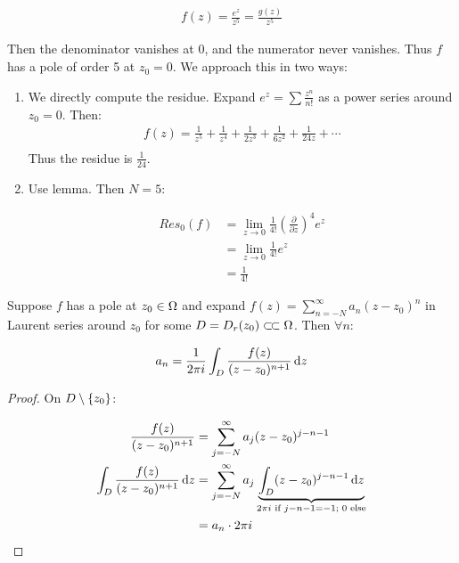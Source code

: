 \begin{example}
\begin{align*}
    f(z) = \frac{e^z}{z^5} = \frac{g(z)}{z^5}
\end{align*}

Then the denominator vanishes at 0, and the numerator never vanishes. Thus $f$ has a pole of order 5 at $z_0 = 0$. We approach this in two ways:

\begin{enumerate}
    \item We directly compute the residue. Expand $e^z = \sum \frac{z^n}{n!}$ as a power series around $z_0 = 0$. Then:
    \begin{align*}
        f(z) = \frac{1}{z^5} + \frac{1}{z^4} +\frac{1}{2z^3} + \frac{1}{6z^2} + \frac{1}{24z} + \cdots\\
    \end{align*}
    Thus the residue is $\frac{1}{24}$.
    
    \item Use lemma. Then $N=5$:
    
    \begin{align*}
        Res_{0}(f) &= \lim_{z \to 0} \frac{1}{4!} \left( \frac{\partial }{\partial z} \right)^4 e^z \\
        &= \lim_{z \to 0} \frac{1}{4!} e^z\\
        &= \frac{1}{4!}
    \end{align*}
\end{enumerate}
\end{example}

\begin{lemma}
Suppose $f$ has a pole at $z_0 \in \Omega$ and expand $f(z) = \sum_{n=-N}^\infty a_n (z-z_0)^n$ in Laurent series around $z_0$ for some $D = D_r(z_0) \ssubset \om$. Then $\forall n$:

\begin{align*}
    a_n = \frac{1}{2 \pi i} \int_D \frac{f(z)}{(z-z_0)^{n+1}} \dif z
\end{align*}
\end{lemma}

\begin{proof} On $D \setminus \{ z_0 \}$:

\begin{align*}
    \frac{f(z)}{(z-z_0)^{n+1}} &= \sum_{j=-N}^\infty a_j (z-z_0)^{j-n-1}\\
    \int_D \frac{f(z)}{(z-z_0)^{n+1}} \dif z &= \sum_{j=-N}^\infty a_j \underbrace{\int_D (z-z_0)^{j-n-1} \dif z}_{2\pi i \text{ if } j-n-1=-1;\text{ 0 else}}\\
    &= a_n \cdot 2 \pi i
\end{align*}

\end{proof}

